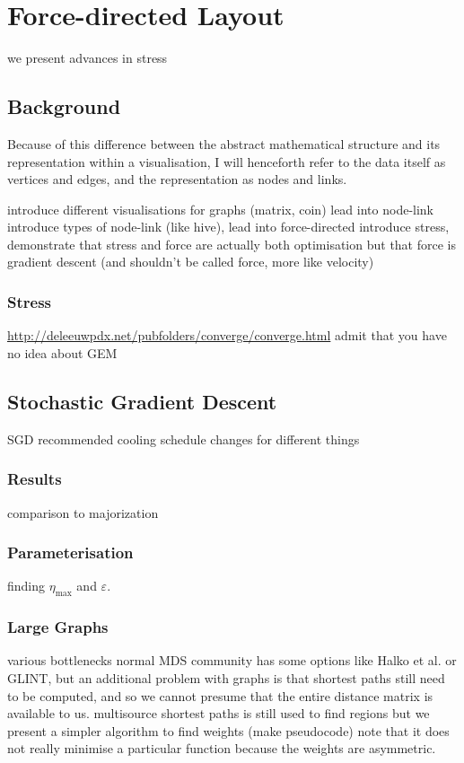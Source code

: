 \chapter{Force-directed Layout}
we present advances in stress

\section{Background}
Because of this difference between the abstract mathematical structure and its representation within a visualisation, I will henceforth refer to the data itself as vertices and edges, and the representation as nodes and links.

introduce different visualisations for graphs (matrix, coin) lead into node-link
introduce types of node-link (like hive), lead into force-directed
introduce stress, demonstrate that stress and force are actually both optimisation but that force is gradient descent (and shouldn't be called force, more like velocity)
\subsection{Stress}
\url{http://deleeuwpdx.net/pubfolders/converge/converge.html}
admit that you have no idea about GEM 

\section{Stochastic Gradient Descent}
SGD
recommended cooling schedule changes for different things
\subsection{Results}
comparison to majorization
\subsection{Parameterisation}
finding $\eta_{\max}$ and $\varepsilon$.
\subsection{Large Graphs}
various bottlenecks
normal MDS community has some options like Halko et al. or GLINT, but an additional problem with graphs is that shortest paths still need to be computed, and so we cannot presume that the entire distance matrix is available to us.
multisource shortest paths is still used to find regions
but we present a simpler algorithm to find weights (make pseudocode)
note that it does not really minimise a particular function because the weights are asymmetric.

